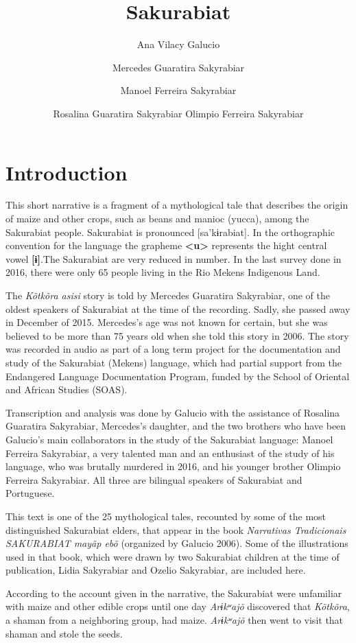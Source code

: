 \documentclass[output=paper,
modfonts,nonflat
]{langsci/langscibook}
\author{Ana Vilacy Galucio\affiliation{Museu Paraense Emílio Goeldi}%
\and Mercedes Guaratira Sakyrabiar%
\and Manoel Ferreira Sakyrabiar%
\and Rosalina Guaratira Sakyrabiar%
\lastand Olimpio Ferreira Sakyrabiar%
}%
\title{Sakurabiat}
\begin{document}
\section{Introduction} 

This short narrative is a fragment of a mythological tale that describes the origin of maize and other crops, such as beans and manioc (yucca), among the Sakurabiat people.
Sakurabiat is pronounced [sa'kɨrabiat]. In the orthographic convention for the language the grapheme \textbf{<u>} represents the hight central vowel \textbf{[ɨ]}.The Sakurabiat are very reduced in number. In the last survey done in 2016, there were only 65 people living in the Rio Mekens Indigenous Land.

The \textit{Kõtkõra asisi} story is told by Mercedes Guaratira Sakyrabiar, one of the oldest speakers of Sakurabiat at the time of the recording. Sadly, she passed away in December of 2015. Mercedes's age was not known for certain, but she was believed to be more than 75 years old when she told this story in 2006. 
The story was recorded in audio as part of a long term project for the documentation and study of the Sakurabiat (Mekens) language, which had partial support from the Endangered Language Documentation Program, funded by the School of Oriental and African Studies (SOAS). 

Transcription and analysis was done by Galucio with the assistance of Rosalina Guaratira Sakyrabiar, Mercedes's daughter, and the two brothers who have been Galucio's main collaborators in the study of the Sakurabiat language: Manoel Ferreira Sakyrabiar, a very talented man and an enthusiast of the study of his language, who was brutally murdered in 2016, and his younger brother Olimpio Ferreira Sakyrabiar. All three are bilingual speakers of Sakurabiat and Portuguese. 

This text is one of the 25 mythological tales, recounted by some of the most distinguished Sakurabiat elders, that appear in the book \textit{Narrativas Tradicionais SAKURABIAT mayãp ebõ} (organized by Galucio 2006). Some of the illustrations used in that book, which were drawn by two Sakurabiat children at the time of publication, Lidia Sakyrabiar and Ozelio Sakyrabiar, are included here.

According to the account given in the narrative, the Sakurabiat were unfamiliar with maize and other edible crops until one day \textit{Arɨkʷajõ} discovered that \textit{Kõtkõra}, a shaman from a neighboring group, had maize. \textit{Arɨkʷajõ} then went to visit that shaman and stole the seeds. 
\end{document}
